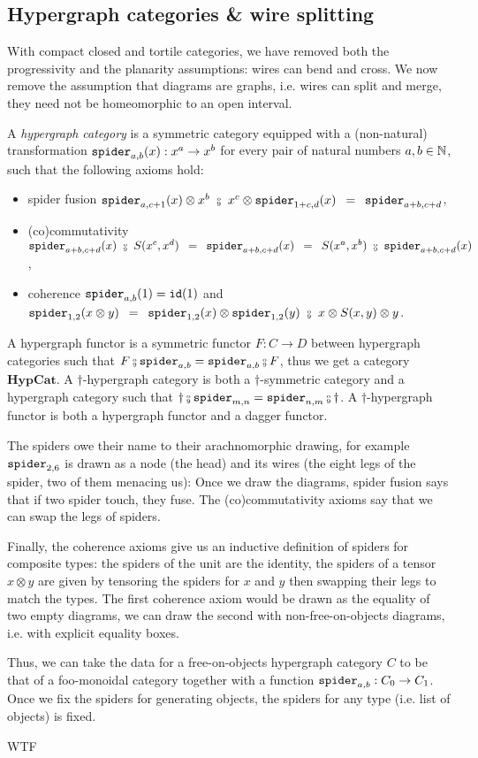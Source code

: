 
\subsection{Hypergraph categories \& wire splitting} \label{subsection:hypergraph}

With compact closed and tortile categories, we have removed both the progressivity and the planarity assumptions: wires can bend and cross.
We now remove the assumption that diagrams are graphs, i.e. wires can split and merge, they need not be homeomorphic to an open interval.

A \emph{hypergraph category} is a symmetric category equipped with a (non-natural) transformation $\mathtt{spider}_{a, b}(x) : x^a \to x^b$ for every pair of natural numbers $a, b \in \mathbb{N}$, such that the following axioms hold:
\begin{itemize}
\item spider fusion $\spider_{a, c + 1}(x) \otimes x^b \ \fcmp \ x^c \otimes \spider_{1 + c, d}(x)
\s = \s \spider_{a + b, c + d}$,
\item (co)commutativity $\spider_{a + b, c + d}(x) \ \fcmp \ S(x^c, x^d)
\s = \s \spider_{a + b, c + d}(x) \s = \s
S(x^a, x^b) \ \fcmp \ \spider_{a + b, c + d}(x)$,
\item coherence $\mathtt{spider}_{a, b}(1) = \mathtt{id}(1)$ and $\spider_{1, 2}(x \otimes y) \s = \s \spider_{1, 2}(x) \otimes \spider_{1, 2}(y) \ \fcmp \ x \otimes S(x, y) \otimes y$.
\end{itemize}
A hypergraph functor is a symmetric functor $F : C \to D$ between hypergraph categories such that $F \fcmp \spider_{a, b} = \spider_{a, b} \fcmp F$, thus we get a category $\mathbf{HypCat}$.
A $\dagger$-hypergraph category is both a $\dagger$-symmetric category and a hypergraph category such that $\dagger \fcmp \spider_{m,n} = \spider_{n, m} \fcmp \dagger$.
A $\dagger$-hypergraph functor is both a hypergraph functor and a dagger functor.

The spiders owe their name to their arachnomorphic drawing, for example $\mathtt{spider}_{2, 6}$ is drawn as a node (the head) and its wires (the eight legs of the spider, two of them menacing us):
Once we draw the diagrams, spider fusion says that if two spider touch, they fuse.
The (co)commutativity axioms say that we can swap the legs of spiders.

Finally, the coherence axioms give us an inductive definition of spiders for composite types: the spiders of the unit are the identity, the spiders of a tensor $x \otimes y$ are given by tensoring the spiders for $x$ and $y$ then swapping their legs to match the types.
The first coherence axiom would be drawn as the equality of two empty diagrams, we can draw the second with non-free-on-objects diagrams, i.e. with explicit equality boxes.

Thus, we can take the data for a free-on-objects hypergraph category $C$ to be that of a foo-monoidal category together with a function $\mathtt{spider}_{a, b} : C_0 \to C_1$.
Once we fix the spiders for generating objects, the spiders for any type (i.e. list of objects) is fixed.

WTF
